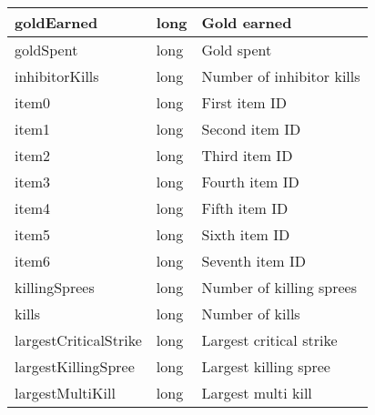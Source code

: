 \begin{table}[!htb]
\begin{tabular}{|llp{5cm}|}
goldEarned                      & long               & Gold earned                                                                     \\ \hline
goldSpent                       & long               & Gold spent                                                                      \\ \hline
inhibitorKills                  & long               & Number of inhibitor kills                                                       \\ \hline
item0                           & long               & First item ID                                                                   \\ \hline
item1                           & long               & Second item ID                                                                  \\ \hline
item2                           & long               & Third item ID                                                                   \\ \hline
item3                           & long               & Fourth item ID                                                                  \\ \hline
item4                           & long               & Fifth item ID                                                                   \\ \hline
item5                           & long               & Sixth item ID                                                                   \\ \hline
item6                           & long               & Seventh item ID                                                                 \\ \hline
killingSprees                   & long               & Number of killing sprees                                                        \\ \hline
kills                           & long               & Number of kills                                                                 \\ \hline
largestCriticalStrike           & long               & Largest critical strike                                                         \\ \hline
largestKillingSpree             & long               & Largest killing spree                                                           \\ \hline
largestMultiKill                & long               & Largest multi kill                                                              \\ \hline

\end{tabular}
\end{table}
